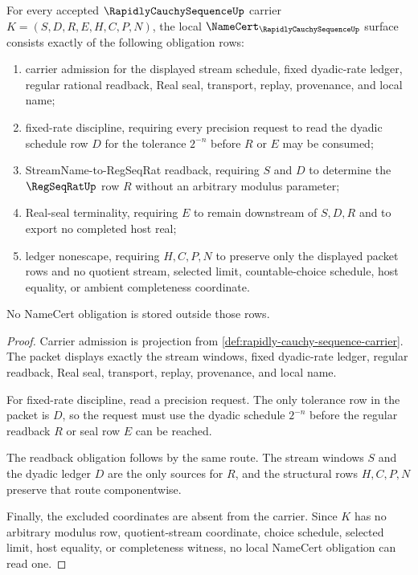 \begin{theorem}
\label{thm:rapidly-cauchy-sequence-namecert-obligations}
For every accepted $\RapidlyCauchySequenceUp$ carrier $K=(S,D,R,E,H,C,P,N)$, the local $\NameCert_{\RapidlyCauchySequenceUp}$ surface consists exactly of the following obligation rows:
\begin{enumerate}
\item carrier admission for the displayed stream schedule, fixed dyadic-rate ledger, regular rational readback, Real seal, transport, replay, provenance, and local name;
\item fixed-rate discipline, requiring every precision request to read the dyadic schedule row $D$ for the tolerance $2^{-n}$ before $R$ or $E$ may be consumed;
\item StreamName-to-RegSeqRat readback, requiring $S$ and $D$ to determine the $\RegSeqRatUp$ row $R$ without an arbitrary modulus parameter;
\item Real-seal terminality, requiring $E$ to remain downstream of $S,D,R$ and to export no completed host real;
\item ledger nonescape, requiring $H,C,P,N$ to preserve only the displayed packet rows and no quotient stream, selected limit, countable-choice schedule, host equality, or ambient completeness coordinate.
\end{enumerate}
No NameCert obligation is stored outside those rows.
\end{theorem}
\begin{proof}
Carrier admission is projection from \autoref{def:rapidly-cauchy-sequence-carrier}. The packet displays exactly the stream windows, fixed dyadic-rate ledger, regular readback, Real seal, transport, replay, provenance, and local name.

For fixed-rate discipline, read a precision request. The only tolerance row in the packet is $D$, so the request must use the dyadic schedule $2^{-n}$ before the regular readback $R$ or seal row $E$ can be reached.

The readback obligation follows by the same route. The stream windows $S$ and the dyadic ledger $D$ are the only sources for $R$, and the structural rows $H,C,P,N$ preserve that route componentwise.

Finally, the excluded coordinates are absent from the carrier. Since $K$ has no arbitrary modulus row, quotient-stream coordinate, choice schedule, selected limit, host equality, or completeness witness, no local NameCert obligation can read one.
\end{proof}

